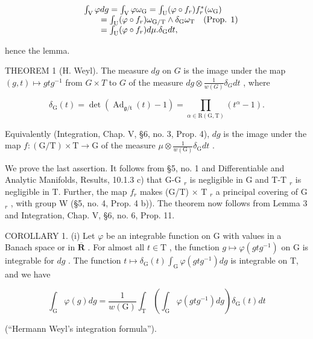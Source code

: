 \[
\begin{array}{r l} & {\int_ {\mathrm{V}} \varphi d g = \int_ {\mathrm{V}} \varphi \omega_ {\mathrm{G}} = \int_ {\mathrm{U}} (\varphi \circ f _ {r}) f _ {r} ^ {*} (\omega_ {\mathrm{G}})} \\ & {\qquad = \int_ {\mathrm{U}} (\varphi \circ f _ {r}) \omega_ {\mathrm{G/T}} \wedge \delta_ {\mathrm{G}} \omega_ {\mathrm{T}} \quad (\text {Prop. 1})} \\ & {\qquad = \int_ {\mathrm{U}} (\varphi \circ f _ {r}) d \mu . \delta_ {\mathrm{G}} d t,} \end{array}
\]

hence the lemma.

THEOREM 1 (H. Weyl). The measure \(dg\) on \(G\) is the image under the map \((g, t) \mapsto gtg^{-1}\) from \(G \times T\) to \(G\) of the measure \(dg \otimes \frac{1}{w(G)}\delta_G dt\) , where

\[
\delta_ {\mathrm{G}} (t) = \det (\operatorname{Ad} _ {\mathfrak {g} / \mathfrak {t}} (t) - 1) = \prod_ {\alpha \in \mathrm{R} (\mathrm{G}, \mathrm{T})} (t ^ {\alpha} - 1).
\]

Equivalently (Integration, Chap. V, §6, no. 3, Prop. 4), \(dg\) is the image under the map \(f: (\mathrm{G} / \mathrm{T}) \times \mathrm{T} \to \mathrm{G}\) of the measure \(\mu \otimes \frac{1}{w(\mathrm{G})}\delta_{\mathrm{G}}dt\) .

We prove the last assertion. It follows from §5, no. 1 and Differentiable and Analytic Manifolds, Results, 10.1.3 c) that G-G \(_{r}\) is negligible in G and T-T \(_{r}\) is negligible in T. Further, the map \(f_{r}\) makes (G/T) × T \(_{r}\) a principal covering of G \(_{r}\) , with group W (§5, no. 4, Prop. 4 b)). The theorem now follows from Lemma 3 and Integration, Chap. V, §6, no. 6, Prop. 11.

COROLLARY 1. (i) Let \(\varphi\) be an integrable function on G with values in a Banach space or in \(\overline{\mathbf{R}}\) . For almost all \(t \in \mathrm{T}\) , the function \(g \mapsto \varphi(gtg^{-1})\) on G is integrable for \(dg\) . The function \(t \mapsto \delta_{\mathrm{G}}(t) \int_{\mathrm{G}} \varphi(gtg^{-1}) dg\) is integrable on T, and we have

\[
\int_ {\mathrm{G}} \varphi (g) d g = \frac {1}{w (\mathrm{G})} \int_ {\mathrm{T}} \left(\int_ {\mathrm{G}} \varphi (g t g ^ {- 1}) d g\right) \delta_ {\mathrm{G}} (t) d t\tag{4}
\]

(``Hermann Weyl's integration formula'').

